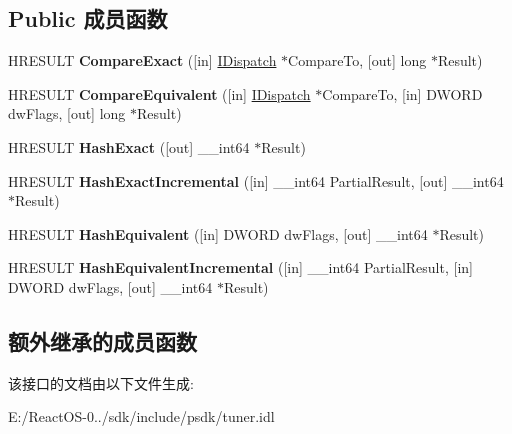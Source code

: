 \subsection*{Public 成员函数}
\begin{DoxyCompactItemize}
\item 
\mbox{\label{interface_i_b_d_a_comparable_a48b11bbcce2d00d49d6da809bcfd4123}} 
H\+R\+E\+S\+U\+LT {\bfseries Compare\+Exact} (\mbox{[}in\mbox{]} \hyperlink{interface_i_dispatch}{I\+Dispatch} $\ast$Compare\+To, \mbox{[}out\mbox{]} long $\ast$Result)
\item 
\mbox{\label{interface_i_b_d_a_comparable_a6abf704740d8274b5cad9de461ba17d0}} 
H\+R\+E\+S\+U\+LT {\bfseries Compare\+Equivalent} (\mbox{[}in\mbox{]} \hyperlink{interface_i_dispatch}{I\+Dispatch} $\ast$Compare\+To, \mbox{[}in\mbox{]} D\+W\+O\+RD dw\+Flags, \mbox{[}out\mbox{]} long $\ast$Result)
\item 
\mbox{\label{interface_i_b_d_a_comparable_a26de4a39fd4c4c6768c8f691a70e1166}} 
H\+R\+E\+S\+U\+LT {\bfseries Hash\+Exact} (\mbox{[}out\mbox{]} \+\_\+\+\_\+int64 $\ast$Result)
\item 
\mbox{\label{interface_i_b_d_a_comparable_ab02d55886a3f5c761fcf0489a320a6c5}} 
H\+R\+E\+S\+U\+LT {\bfseries Hash\+Exact\+Incremental} (\mbox{[}in\mbox{]} \+\_\+\+\_\+int64 Partial\+Result, \mbox{[}out\mbox{]} \+\_\+\+\_\+int64 $\ast$Result)
\item 
\mbox{\label{interface_i_b_d_a_comparable_a1f32dd98b2e3cc7b032ddb6b5cafad94}} 
H\+R\+E\+S\+U\+LT {\bfseries Hash\+Equivalent} (\mbox{[}in\mbox{]} D\+W\+O\+RD dw\+Flags, \mbox{[}out\mbox{]} \+\_\+\+\_\+int64 $\ast$Result)
\item 
\mbox{\label{interface_i_b_d_a_comparable_a778eafb24fa1eec88ee5f9ee83822626}} 
H\+R\+E\+S\+U\+LT {\bfseries Hash\+Equivalent\+Incremental} (\mbox{[}in\mbox{]} \+\_\+\+\_\+int64 Partial\+Result, \mbox{[}in\mbox{]} D\+W\+O\+RD dw\+Flags, \mbox{[}out\mbox{]} \+\_\+\+\_\+int64 $\ast$Result)
\end{DoxyCompactItemize}
\subsection*{额外继承的成员函数}


该接口的文档由以下文件生成\+:\begin{DoxyCompactItemize}
\item 
E\+:/\+React\+O\+S-\/0../sdk/include/psdk/tuner.\+idl\end{DoxyCompactItemize}
